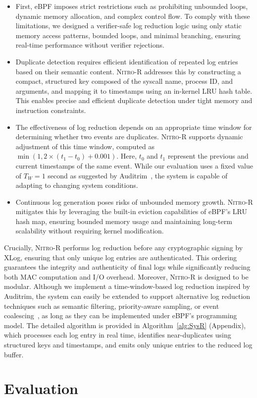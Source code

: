 \documentclass[sigconf]{sty/acmart}
\newcommand{\SysR}{\mbox{\textsc{Nitro-R}}\xspace}
\newcommand{\xlog}{XLog\xspace}
\begin{document}
\begin{itemize}[leftmargin=*]

\item First, eBPF imposes strict restrictions such as prohibiting unbounded loops, dynamic memory allocation, and complex control flow. To comply with these limitations, we designed a verifier-safe log reduction logic using only static memory access patterns, bounded loops, and minimal branching, ensuring real-time performance without verifier rejections.

\item Duplicate detection requires efficient identification of repeated log entries based on their semantic content. \SysR addresses this by constructing a compact, structured key composed of the syscall name, process ID, and arguments, and mapping it to timestamps using an in-kernel LRU hash table. This enables precise and efficient duplicate detection under tight memory and instruction constraints.

\item The effectiveness of log reduction depends on an appropriate time window for determining whether two events are duplicates. \SysR supports dynamic adjustment of this time window, computed as $\min(1, 2 \times (t_1 - t_0) + 0.001)$. Here, $t_0$ and $t_1$ represent the previous and current timestamps of the same event. While our evaluation uses a fixed value of $T_W = 1$ second as suggested by Auditrim~\cite{auditrim}, the system is capable of adapting to changing system conditions.

\item Continuous log generation poses risks of unbounded memory growth. \SysR mitigates this by leveraging the built-in eviction capabilities of eBPF’s LRU hash map, ensuring bounded memory usage and maintaining long-term scalability without requiring kernel modification.

\end{itemize}

Crucially, \SysR performs log reduction before any cryptographic signing by \xlog, ensuring that only unique log entries are authenticated. This ordering guarantees the integrity and authenticity of final logs while significantly reducing both MAC computation and I/O overhead. Moreover, \SysR is designed to be modular. Although we implement a time-window-based log reduction inspired by Auditrim, the system can easily be extended to support alternative log reduction techniques such as semantic filtering, priority-aware sampling, or event coalescing~\cite{tang2018nodemerge,loggc,inam2022sok}, as long as they can be implemented under eBPF's programming model. The detailed algorithm is provided in Algorithm~\ref{alg:SysR} (Appendix), which processes each log entry in real time, identifies near-duplicates using structured keys and timestamps, and emits only unique entries to the reduced log buffer. \section{Evaluation}
\label{s:eval}
\end{document}
